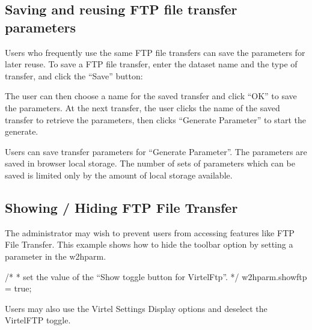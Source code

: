 \documentclass[letterpaper,10pt,english]{sphinxmanual}
\begin{document}
\subsection{Saving and reusing FTP file transfer parameters}
\label{\detokenize{Customization:saving-and-reusing-ftp-file-transfer-parameters}}
\sphinxAtStartPar
Users who frequently use the same FTP file transfers can save the parameters for later reuse. To save a FTP file transfer, enter the dataset name and the type of transfer, and click the “Save” button: \sphinxhyphen{}

\sphinxAtStartPar
{}

\sphinxAtStartPar
{}

\sphinxAtStartPar
The user can then choose a name for the saved transfer and click “OK” to save the parameters. At the next transfer, the user clicks the name of the saved transfer to retrieve the parameters, then clicks “Generate Parameter” to start the generate.

\sphinxAtStartPar
{}

\sphinxAtStartPar
{}

\sphinxAtStartPar
Users can save transfer parameters for “Generate Parameter”. The parameters are saved in browser local storage. The number of sets of parameters which can be saved is limited only by the amount of local storage available.


\subsection{Showing / Hiding FTP File Transfer}
\label{\detokenize{Customization:showing-hiding-ftp-file-transfer}}
\sphinxAtStartPar
The administrator may wish to prevent users from accessing features like FTP File Transfer. This example shows how to hide the toolbar option by setting a parameter in the w2hparm.

\begin{sphinxVerbatim}[commandchars=\\\{\}]
/*
* set the value of the “Show toggle button for VirtelFtp”.
*/
w2hparm.showftp = true;
\end{sphinxVerbatim}

\sphinxAtStartPar
{}

\sphinxAtStartPar
Users may also use the Virtel Settings Display options and deselect the VirtelFTP toggle.
\end{document}

